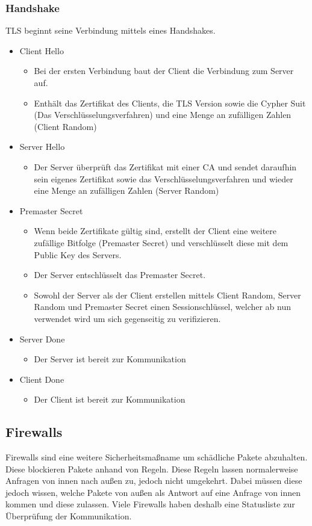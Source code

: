\documentclass{article}
\begin{document}
	  \subsubsection{Handshake}
	  TLS beginnt seine Verbindung mittels eines Handshakes. 
	  \begin{itemize}
	  	\item{Client Hello}
	  	\begin{itemize}
	  		\item{Bei der ersten Verbindung baut der Client die Verbindung zum Server auf.}
	  		\item{Enthält das Zertifikat des Clients, die TLS Version sowie die Cypher Suit (Das Verschlüsselungsverfahren) und eine Menge an zufälligen Zahlen (Client Random)}
	  	\end{itemize}
	  	\item{Server Hello}
	  	\begin{itemize}
	  		\item{Der Server überprüft das Zertifikat mit einer CA und sendet daraufhin sein eigenes Zertifikat sowie das Verschlüsselungsverfahren und wieder eine Menge an zufälligen Zahlen (Server Random)}
	  	\end{itemize}
	  	\item{Premaster Secret}
	  	\begin{itemize}
	  		\item{Wenn beide Zertifikate gültig sind, erstellt der Client eine weitere zufällige Bitfolge (Premaster Secret) und verschlüsselt diese mit dem Public Key des Servers.}
	  		\item{Der Server entschlüsselt das Premaster Secret.}
	  		\item{Sowohl der Server als der Client erstellen mittels Client Random, Server Random und Premaster Secret einen Sessionschlüssel, welcher ab nun verwendet wird um sich gegenseitig zu verifizieren.}
	  	\end{itemize}
	  	\item{Server Done}
	  	\begin{itemize}
	  		\item{Der Server ist bereit zur Kommunikation}
	  	\end{itemize}
	  	\item{Client Done}
	  	\begin{itemize}
	  		\item{Der Client ist bereit zur Kommunikation}
	  	\end{itemize}
	  \end{itemize}
	  \subsection{Firewalls}
	  Firewalls sind eine weitere Sicherheitsmaßname um schädliche Pakete abzuhalten. Diese blockieren Pakete anhand von Regeln. Diese Regeln lassen normalerweise Anfragen von innen nach außen zu, jedoch nicht umgekehrt. Dabei müssen diese jedoch wissen, welche Pakete von außen als Antwort auf eine Anfrage von innen kommen und diese zulassen. Viele Firewalls haben deshalb eine Statusliste zur Überprüfung der Kommunikation.
\end{document}
